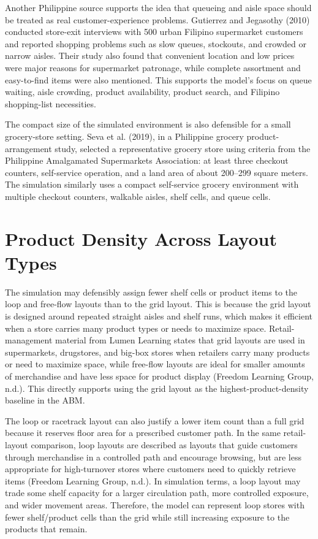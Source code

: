 \documentclass[12pt]{article}
\begin{document}
Another Philippine source supports the idea that queueing and aisle space should be treated as real customer-experience problems. Gutierrez and Jegasothy (2010) conducted store-exit interviews with 500 urban Filipino supermarket customers and reported shopping problems such as slow queues, stockouts, and crowded or narrow aisles. Their study also found that convenient location and low prices were major reasons for supermarket patronage, while complete assortment and easy-to-find items were also mentioned. This supports the model's focus on queue waiting, aisle crowding, product availability, product search, and Filipino shopping-list necessities.

The compact size of the simulated environment is also defensible for a small grocery-store setting. Seva et al. (2019), in a Philippine grocery product-arrangement study, selected a representative grocery store using criteria from the Philippine Amalgamated Supermarkets Association: at least three checkout counters, self-service operation, and a land area of about 200--299 square meters. The simulation similarly uses a compact self-service grocery environment with multiple checkout counters, walkable aisles, shelf cells, and queue cells.

\section{Product Density Across Layout Types}

The simulation may defensibly assign fewer shelf cells or product items to the loop and free-flow layouts than to the grid layout. This is because the grid layout is designed around repeated straight aisles and shelf runs, which makes it efficient when a store carries many product types or needs to maximize space. Retail-management material from Lumen Learning states that grid layouts are used in supermarkets, drugstores, and big-box stores when retailers carry many products or need to maximize space, while free-flow layouts are ideal for smaller amounts of merchandise and have less space for product display (Freedom Learning Group, n.d.). This directly supports using the grid layout as the highest-product-density baseline in the ABM.

The loop or racetrack layout can also justify a lower item count than a full grid because it reserves floor area for a prescribed customer path. In the same retail-layout comparison, loop layouts are described as layouts that guide customers through merchandise in a controlled path and encourage browsing, but are less appropriate for high-turnover stores where customers need to quickly retrieve items (Freedom Learning Group, n.d.). In simulation terms, a loop layout may trade some shelf capacity for a larger circulation path, more controlled exposure, and wider movement areas. Therefore, the model can represent loop stores with fewer shelf/product cells than the grid while still increasing exposure to the products that remain.
\end{document}
